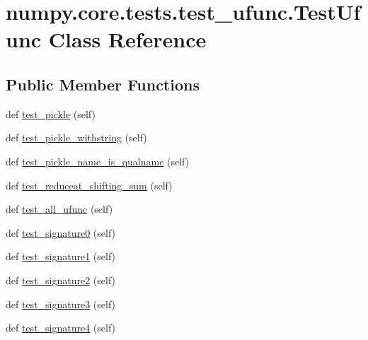 \hypertarget{classnumpy_1_1core_1_1tests_1_1test__ufunc_1_1TestUfunc}{}\section{numpy.\+core.\+tests.\+test\+\_\+ufunc.\+Test\+Ufunc Class Reference}
\label{classnumpy_1_1core_1_1tests_1_1test__ufunc_1_1TestUfunc}
\subsection*{Public Member Functions}
\begin{DoxyCompactItemize}
\item 
def \hyperlink{classnumpy_1_1core_1_1tests_1_1test__ufunc_1_1TestUfunc_ab172892317dbb0d136587f7535aa87a6}{test\+\_\+pickle} (self)
\item 
def \hyperlink{classnumpy_1_1core_1_1tests_1_1test__ufunc_1_1TestUfunc_aded62bffd7326f995e147b5dec924b14}{test\+\_\+pickle\+\_\+withstring} (self)
\item 
def \hyperlink{classnumpy_1_1core_1_1tests_1_1test__ufunc_1_1TestUfunc_ae2427bcf7e259ddee1cfc32c23ba69ed}{test\+\_\+pickle\+\_\+name\+\_\+is\+\_\+qualname} (self)
\item 
def \hyperlink{classnumpy_1_1core_1_1tests_1_1test__ufunc_1_1TestUfunc_a7a9daa74d17fa9f27f2ab01879160b30}{test\+\_\+reduceat\+\_\+shifting\+\_\+sum} (self)
\item 
def \hyperlink{classnumpy_1_1core_1_1tests_1_1test__ufunc_1_1TestUfunc_a3f4d907df31fb9998791705268b1bff0}{test\+\_\+all\+\_\+ufunc} (self)
\item 
def \hyperlink{classnumpy_1_1core_1_1tests_1_1test__ufunc_1_1TestUfunc_a6954165decfedbf927e02deadf62209a}{test\+\_\+signature0} (self)
\item 
def \hyperlink{classnumpy_1_1core_1_1tests_1_1test__ufunc_1_1TestUfunc_a709b889c94ca00157875f187c0d9ab86}{test\+\_\+signature1} (self)
\item 
def \hyperlink{classnumpy_1_1core_1_1tests_1_1test__ufunc_1_1TestUfunc_a63cb1c94708d75ce7078dfa7030cfe61}{test\+\_\+signature2} (self)
\item 
def \hyperlink{classnumpy_1_1core_1_1tests_1_1test__ufunc_1_1TestUfunc_a06da49a60358dc4c3847e717891e7738}{test\+\_\+signature3} (self)
\item 
def \hyperlink{classnumpy_1_1core_1_1tests_1_1test__ufunc_1_1TestUfunc_aedad8cb2288224fe2f8c404163d9f633}{test\+\_\+signature4} (self)

\end{DoxyCompactItemize}
